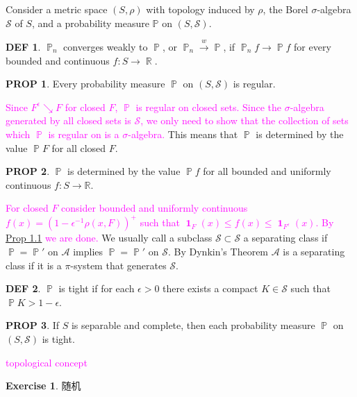 \documentclass[hidelinks,11pt]{article}
\theoremstyle{definition}
\newtheorem*{defin}{DEF}
\newtheorem*{ex}{Exercise}
\theoremstyle{dotless}
\newtheorem{prop}{PROP}[section]
\theoremstyle{named}
\theoremstyle{remark}
\DeclareMathOperator{\R}{\mathbb{R}}
\DeclareMathOperator{\1}{\mathbf{1}}
\DeclareMathOperator{\p}{\mathbb{P}}
\begin{document}
Consider a metric space $(S,\rho)$ with topology induced by $\rho$, the Borel $\sigma$-algebra $\mathcal{S}$ of $S$, and a probability measure $\mathbb{P}$ on $(S,\mathcal{S})$.
\begin{defin}
$\p_n$ converges weakly to $\p$, or $\p_n\xrightarrow{w}\p$, if $\p_nf\to\p f$ for every bounded and continuous $f:S\to\R$.
\end{defin}
\begin{prop}\label{Prop 1.1}
Every probability measure $\p$ on $(S,\mathcal{S})$ is regular.
\end{prop}
\textcolor{magenta}{Since $F^\epsilon\searrow F$ for closed $F$, $\p$ is regular on closed sets. Since the $\sigma$-algebra generated by all closed sets is $\mathcal{S}$, we only need to show that the collection of sets which $\p$ is regular on is a $\sigma$-algebra.}\medbreak
This means that $\p$ is determined by the value $\p F$ for all closed $F$.
\begin{prop}
$\p$ is determined by the value $\p f$ for all bounded and uniformly continuous $f:S\to\mathbb{R}$.
\end{prop}
\textcolor{magenta}{For closed $F$ consider bounded and uniformly continuous $f(x)=(1-\epsilon^{-1}\rho( x,F))^+$ such that $\1_F(x)\leq f(x)\leq\1_{F^\epsilon}(x)$. By \hyperref[Prop 1.1]{Prop 1.1} we are done.}\medbreak
We usually call a subclass $\mathcal{S}\subset\mathcal{S}$ a separating class if $\p=\p'$ on $\mathcal{A}$ implies $\p=\p'$ on $\mathcal{S}$. By Dynkin's Theorem $\mathcal{A}$ is a separating class if it is a $\pi$-system that generates $\mathcal{S}$.
\begin{defin}
$\p$ is tight if for each $\epsilon>0$ there exists a compact $K\in\mathcal{S}$ such that $\p K>1-\epsilon$.
\end{defin}
\begin{prop}
If $S$ is separable and complete, then each probability measure $\p$ on $(S,\mathcal{S})$ is tight.
\end{prop}
\textcolor{magenta}{topological concept}

\begin{ex}
随机
\end{ex}
\end{document}

